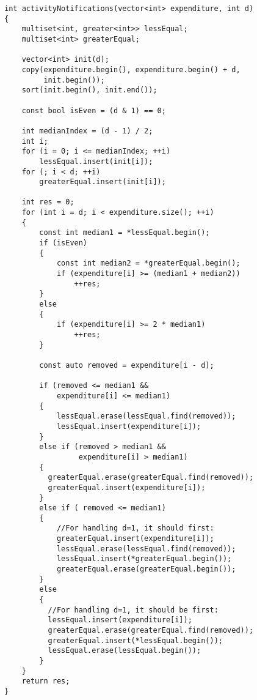 \documentclass{book}
\begin{document}
	\begin{lstlisting}
int activityNotifications(vector<int> expenditure, int d)
{
    multiset<int, greater<int>> lessEqual;
    multiset<int> greaterEqual;

    vector<int> init(d);
    copy(expenditure.begin(), expenditure.begin() + d,
         init.begin());
    sort(init.begin(), init.end());

    const bool isEven = (d & 1) == 0;

    int medianIndex = (d - 1) / 2;
    int i;
    for (i = 0; i <= medianIndex; ++i)
        lessEqual.insert(init[i]);
    for (; i < d; ++i)
        greaterEqual.insert(init[i]);
    
    int res = 0;
    for (int i = d; i < expenditure.size(); ++i)
    {
        const int median1 = *lessEqual.begin();
        if (isEven)
        {
            const int median2 = *greaterEqual.begin();
            if (expenditure[i] >= (median1 + median2))
                ++res;
        }
        else 
        {
            if (expenditure[i] >= 2 * median1)
                ++res;
        }

        const auto removed = expenditure[i - d];

        if (removed <= median1 && 
            expenditure[i] <= median1)            
        {
            lessEqual.erase(lessEqual.find(removed));
            lessEqual.insert(expenditure[i]);
        }
        else if (removed > median1 && 
                 expenditure[i] > median1)
        {
          greaterEqual.erase(greaterEqual.find(removed));
          greaterEqual.insert(expenditure[i]);
        }
        else if ( removed <= median1)
        {
            //For handling d=1, it should first:
            greaterEqual.insert(expenditure[i]);
            lessEqual.erase(lessEqual.find(removed));
            lessEqual.insert(*greaterEqual.begin());
            greaterEqual.erase(greaterEqual.begin());
        }
        else
        {
          //For handling d=1, it should be first:
          lessEqual.insert(expenditure[i]);
          greaterEqual.erase(greaterEqual.find(removed));
          greaterEqual.insert(*lessEqual.begin());
          lessEqual.erase(lessEqual.begin());
        }
    }
    return res;
}
	
	\end{lstlisting}
\end{document}
